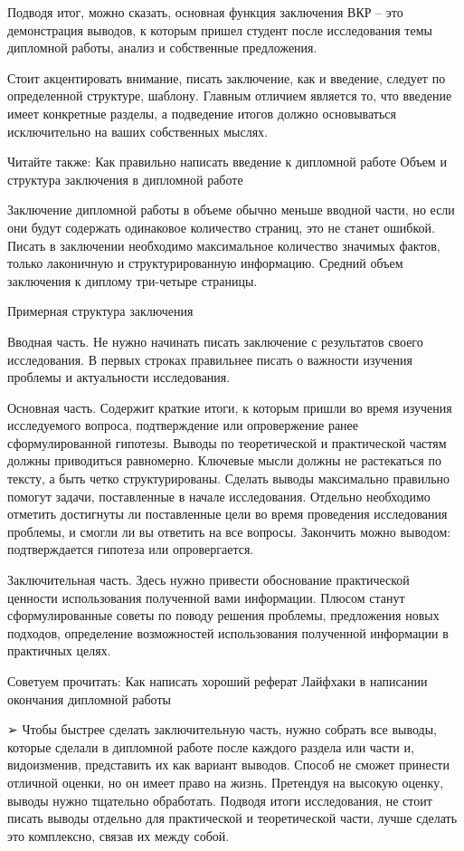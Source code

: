     Подводя итог, можно сказать, основная функция заключения ВКР – это демонстрация выводов, к которым пришел студент после исследования темы дипломной работы, анализ и собственные предложения.

Стоит акцентировать внимание, писать заключение, как и введение, следует по определенной структуре, шаблону. Главным отличием является то, что введение имеет конкретные разделы, а подведение итогов должно основываться исключительно на ваших собственных мыслях.

Читайте также: Как правильно написать введение к дипломной работе
Объем и структура заключения в дипломной работе

Заключение дипломной работы в объеме обычно меньше вводной части, но если они будут содержать одинаковое  количество страниц, это не станет ошибкой. Писать в заключении необходимо максимальное количество значимых фактов, только лаконичную и структурированную информацию. Средний объем заключения к диплому три-четыре страницы.

Примерная структура заключения

Вводная часть. Не нужно начинать писать заключение с результатов своего исследования. В первых строках правильнее писать о важности изучения проблемы и актуальности исследования.

Основная часть. Содержит краткие итоги, к которым пришли во время изучения исследуемого вопроса, подтверждение или опровержение ранее сформулированной гипотезы. Выводы по теоретической и практической частям должны приводиться равномерно.  Ключевые мысли должны не растекаться по тексту, а быть четко структурированы. Сделать выводы максимально правильно помогут задачи, поставленные в начале исследования. Отдельно необходимо отметить достигнуты ли поставленные цели во время проведения исследования проблемы, и смогли ли вы ответить на все вопросы. Закончить можно выводом: подтверждается гипотеза или опровергается.

Заключительная часть. Здесь нужно привести обоснование практической ценности использования полученной вами информации. Плюсом станут сформулированные советы по поводу решения проблемы, предложения новых подходов, определение возможностей использования полученной информации в практичных целях.

Советуем прочитать: Как написать хороший реферат
Лайфхаки в написании окончания дипломной работы

➢    Чтобы быстрее сделать заключительную часть, нужно собрать все выводы, которые сделали в дипломной работе после каждого раздела или части и, видоизменив,  представить их как вариант выводов. Способ не сможет принести отличной оценки, но он имеет право на жизнь.
Претендуя на высокую оценку, выводы нужно тщательно обработать. Подводя итоги исследования, не стоит писать выводы отдельно для  практической и теоретической части, лучше сделать это комплексно, связав их между собой.

